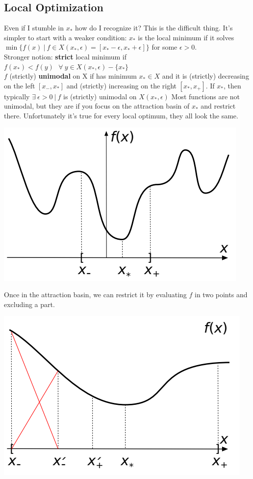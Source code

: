\documentclass[10pt]{report}
\begin{document}
\subsection{Local Optimization} Even if I stumble in $x_*$ how do I recognize it? This is the difficult thing. It's simpler to start with a weaker condition: $x_*$ is the local minimum if it solves $\min\{f(x)\:|\:f\in X(x_*, \epsilon) = [x_* - \epsilon, x_* + \epsilon]\}$ for some $\epsilon > 0$.\\
Stronger notion: \textbf{strict} local minimum if $f(x_*) < f(y)\:\:\:\forall\:y\in X(x_*,\epsilon) - \{x_*\}$\\
$f$ (strictly) \textbf{unimodal} on X if has minimum $x_* \in X$ and it is (strictly) decreasing on the left $[x_-, x_*]$ and (strictly) increasing on the right $[x_*, x_+]$. If $x_*$, then typically $\exists\:\epsilon>0\:|\:f$ is (strictly) unimodal on $X(x_*,\epsilon)$
Most functions are not unimodal, but they are if you focus on the attraction basin of $x_*$ and restrict there. Unfortunately it's true for every local optimum, they all look the same.
\begin{center}
	\includegraphics[scale=0.5]{5.png}
\end{center}
Once in the attraction basin, we can restrict it by evaluating $f$ in two points and excluding a part.
\begin{center}
	\includegraphics[scale=0.5]{6.png}
\end{center}
\end{document}
